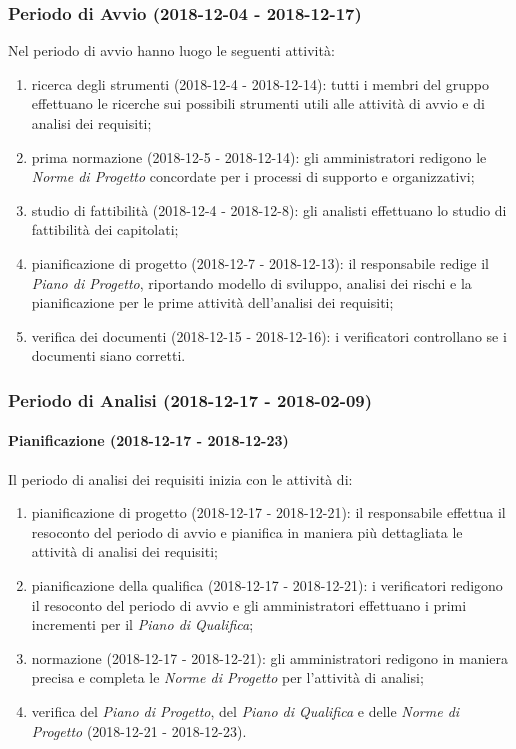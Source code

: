 	\subsubsection{Periodo di Avvio (2018-12-04 - 2018-12-17)}
		Nel periodo di avvio hanno luogo le seguenti attività:
		\begin{enumerate}[label = 1.\arabic*)]
			\item ricerca degli strumenti (2018-12-4 - 2018-12-14): tutti i membri del gruppo effettuano le ricerche sui possibili strumenti utili alle attività di avvio e di analisi dei requisiti;
			\item prima normazione (2018-12-5 - 2018-12-14): gli amministratori redigono le \textit{Norme di Progetto} concordate per i processi di supporto e organizzativi;
			\item studio di fattibilità (2018-12-4 - 2018-12-8): gli analisti effettuano lo studio di fattibilità dei capitolati;
			\item pianificazione di progetto (2018-12-7 - 2018-12-13): il responsabile redige il \textit{Piano di Progetto}, riportando modello di sviluppo, analisi dei rischi e la pianificazione per le prime attività dell'analisi dei requisiti;
			\item verifica dei documenti (2018-12-15 - 2018-12-16): i verificatori controllano se i documenti siano corretti.
		\end{enumerate}
		
	\subsubsection{Periodo di Analisi (2018-12-17 - 2018-02-09)}	
		\paragraph{Pianificazione (2018-12-17 - 2018-12-23)\\} Il periodo di analisi dei requisiti inizia con le attività di:
			\begin{enumerate}[label = 2.1.\arabic*)]
				\item pianificazione di progetto (2018-12-17 - 2018-12-21): il responsabile effettua il resoconto del periodo di avvio e pianifica in maniera più dettagliata le attività di analisi dei requisiti; 
				\item pianificazione della qualifica (2018-12-17 - 2018-12-21): i verificatori redigono il resoconto del periodo di avvio e gli amministratori effettuano i primi incrementi per il \textit{Piano di Qualifica};
				\item normazione (2018-12-17 - 2018-12-21): gli amministratori redigono in maniera precisa e completa le \textit{Norme di Progetto} per l'attività di analisi;
				\item verifica del \textit{Piano di Progetto}, del \textit{Piano di Qualifica} e delle \textit{Norme di Progetto} (2018-12-21 - 2018-12-23).
			\end{enumerate}
